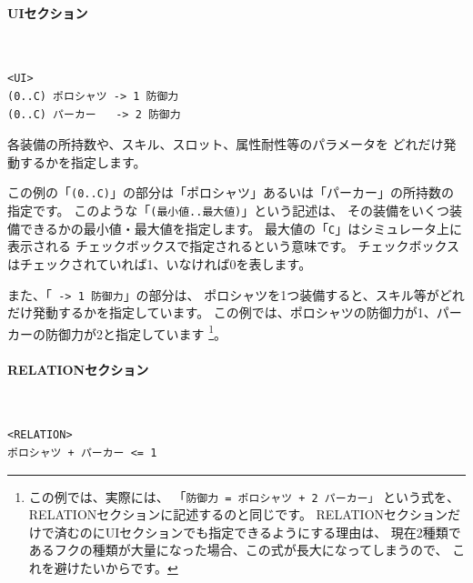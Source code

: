 \documentclass[dvipdfmx]{jsarticle}
\begin{document}
\paragraph{UIセクション}~\medskip
{\footnotesize\begin{mdframed}\begin{Verbatim}
<UI>
(0..C) ポロシャツ -> 1 防御力
(0..C) パーカー   -> 2 防御力
\end{Verbatim}
\end{mdframed}}
\medskip

各装備の所持数や、スキル、スロット、属性耐性等のパラメータを
どれだけ発動するかを指定します。

この例の「\texttt{(0..C)}」の部分は「ポロシャツ」あるいは「パーカー」の所持数の指定です。
このような「\texttt{(最小値..最大値)}」という記述は、
その装備をいくつ装備できるかの最小値・最大値を指定します。
%
最大値の「\texttt{C}」はシミュレータ上に表示される
チェックボックスで指定されるという意味です。
チェックボックスはチェックされていれば1、いなければ0を表します。

\begin{center}
\end{center}

また、「\texttt{ -> 1 防御力}」の部分は、
ポロシャツを1つ装備すると、スキル等がどれだけ発動するかを指定しています。
この例では、ポロシャツの防御力が1、パーカーの防御力が2と指定しています%
\footnote{
この例では、実際には、
「\texttt{防御力 = ポロシャツ + 2 パーカー」}
という式を、RELATIONセクションに記述するのと同じです。
RELATIONセクションだけで済むのにUIセクションでも指定できるようにする理由は、
現在2種類であるフクの種類が大量になった場合、この式が長大になってしまうので、
これを避けたいからです。
}。


\paragraph{RELATIONセクション}~\medskip
{\footnotesize\begin{mdframed}\begin{Verbatim}
<RELATION>
ポロシャツ + パーカー <= 1
\end{Verbatim}
\end{mdframed}}
\medskip
\end{document}
